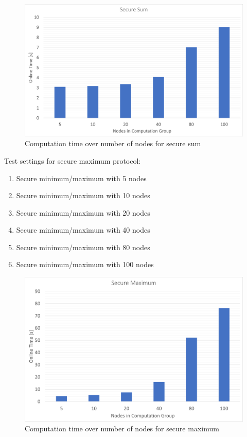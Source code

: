 \begin{figure}[!htbp] %
	\caption{Computation time over number of nodes for secure sum} \label{figure:Computation time over number of nodes for secure sum}
	\includegraphics[scale=1.0]{figures/eval_sum.png}
\end{figure}

Test settings for secure maximum protocol:
\begin{enumerate}
	\item Secure minimum/maximum with 5 nodes
	\item Secure minimum/maximum with 10 nodes
	\item Secure minimum/maximum with 20 nodes
	\item Secure minimum/maximum with 40 nodes
	\item Secure minimum/maximum with 80 nodes
	\item Secure minimum/maximum with 100 nodes
\end{enumerate}


\begin{figure}[!htbp] %
	\caption{Computation time over number of nodes for secure maximum} \label{figure:Computation time over number of nodes for secure maximum}
	\includegraphics[scale=1.0]{figures/eval_max.png}
\end{figure}


